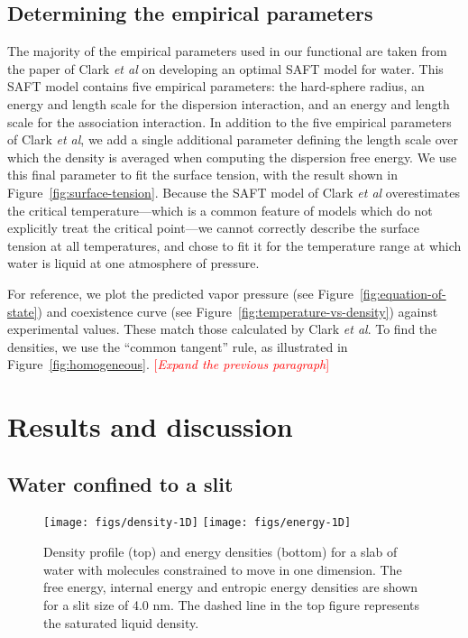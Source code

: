 \documentclass[letterpaper,twocolumn,amsmath,amssymb,prb]{revtex4-1}
\newcommand{\needsworknow}[1]{\textcolor{red}{[\emph{#1}]}}
\begin{document}
\subsection{Determining the empirical parameters}\label{sec:empirical}

The majority of the empirical parameters used in our functional are
taken from the paper of Clark \emph{et al} on developing an optimal
SAFT model for water\cite{clark2006developing}.  This SAFT model
contains five empirical parameters: the hard-sphere radius, an energy
and length scale for the dispersion interaction, and an energy and
length scale for the association interaction.  In addition to the five
empirical parameters of Clark \emph{et al}, we add a single additional
parameter defining the length scale over which the density is averaged
when computing the dispersion free energy.  We use this final
parameter to fit the surface tension, with the result shown in
Figure~\ref{fig:surface-tension}.  Because the SAFT model of Clark
\emph{et al} overestimates the critical temperature---which is a
common feature of models which do not explicitly treat the critical
point---we cannot correctly describe the surface tension at all
temperatures, and chose to fit it for the temperature range at which
water is liquid at one atmosphere of pressure.

For reference, we plot the predicted vapor pressure (see
Figure~\ref{fig:equation-of-state}) and coexistence curve (see
Figure~\ref{fig:temperature-vs-density}) against experimental values.  These
match those calculated by Clark \emph{et al}. To find the densities, we use the
``common tangent'' rule, as illustrated in Figure~\ref{fig:homogeneous}.
\needsworknow{Expand the previous paragraph}

\section{Results and discussion}

\subsection{Water confined to a slit}

\begin{figure}
\begin{center}
\texttt{[image: figs/density-1D]}
\texttt{[image: figs/energy-1D]}
\end{center}
\caption{ Density profile (top) and 
energy densities (bottom) for a slab of water with molecules 
constrained to move in one dimension. The free energy, internal energy
and entropic energy densities are shown for a slit size of 4.0 nm. The dashed
line in the top figure represents the saturated liquid density.}
\label{fig:energy-1D}
\end{figure}
\end{document}
